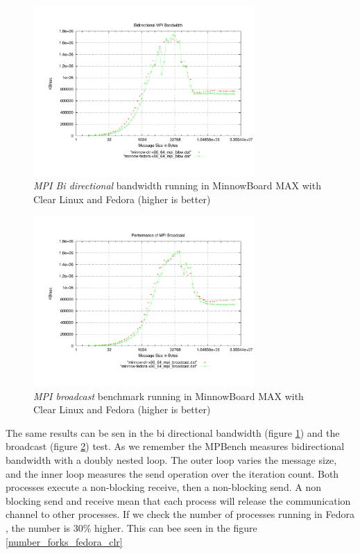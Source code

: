 \begin{figure}[H]
\centering
\includegraphics[width=0.75\textwidth]{images/mpbench_clr_experiments/mpi_bibw.pdf}
\caption{\textit{MPI Bi directional} bandwidth running in  MinnowBoard MAX with Clear Linux
and Fedora (higher is better)}
\label{mpi_bibw_clr_fedora}
\end{figure}


\begin{figure}[H]
\centering
\includegraphics[width=0.75\textwidth]{images/mpbench_clr_experiments/mpi_broadcast.pdf}
\caption{\textit{MPI broadcast} benchmark running in  MinnowBoard MAX with Clear Linux and
Fedora (higher is better)}
\label{mpi_broadcast_clr_fedora}
\end{figure}

The same results can be sen in the bi directional bandwidth (figure
\ref{mpi_bibw_clr_fedora}) and the broadcast (figure
\ref{mpi_broadcast_clr_fedora}) test. As we remember the MPBench measures
bidirectional bandwidth with a doubly nested loop. The outer loop varies the
message size, and the inner loop measures the send operation over the iteration
count. Both processes execute a non-blocking receive, then a non-blocking send.
A non blocking send and receive mean that each process will release the
communication channel to other processes. If we check the number of processes
running in Fedora , the number is 30\% higher. This can bee seen in the figure
\ref{number_forks_fedora_clr}


